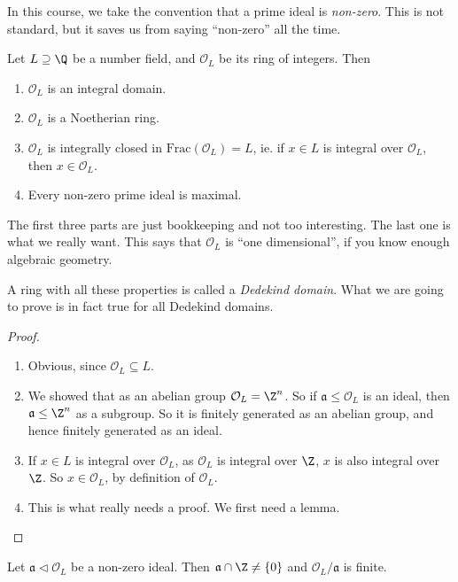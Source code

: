 \documentclass[a4paper]{article}
\begin{document}
In this course, we take the convention that a prime ideal is \emph{non-zero}. This is not standard, but it saves us from saying ``non-zero'' all the time.

\begin{prop}
  Let $L \supseteq \Q$ be a number field, and $\mathcal{O}_L$ be its ring of integers. Then
  \begin{enumerate}
    \item $\mathcal{O}_L$ is an integral domain.
    \item $\mathcal{O}_L$ is a Noetherian ring.
    \item $\mathcal{O}_L$ is integrally closed in $\mathrm{Frac}(\mathcal{O}_L) = L$, ie. if $x \in L$ is integral over $\mathcal{O}_L$, then $x \in \mathcal{O}_L$.
    \item Every non-zero prime ideal is maximal.
  \end{enumerate}
\end{prop}
The first three parts are just bookkeeping and not too interesting. The last one is what we really want. This says that $\mathcal{O}_L$ is ``one dimensional'', if you know enough algebraic geometry.

A ring with all these properties is called a \emph{Dedekind domain}. What we are going to prove is in fact true for all Dedekind domains.

\begin{proof}\leavevmode
  \begin{enumerate}
    \item Obvious, since $\mathcal{O}_L \subseteq L$.
    \item We showed that as an abelian group $\mathcal{O}_L = \Z^n$. So if $\mathfrak{a} \leq \mathcal{O}_L$ is an ideal, then $\mathfrak{a} \leq \Z^n$ as a subgroup. So it is finitely generated as an abelian group, and hence finitely generated as an ideal.
    \item If $x \in L$ is integral over $\mathcal{O}_L$, as $\mathcal{O}_L$ is integral over $\Z$, $x$ is also integral over $\Z$. So $x \in \mathcal{O}_L$, by definition of $\mathcal{O}_L$.
    \item This is what really needs a proof. We first need a lemma.
  \end{enumerate}
\end{proof}

\begin{lemma}
  Let $\mathfrak{a}\lhd \mathcal{O}_L$ be a non-zero ideal. Then $\mathfrak{a} \cap \Z \not= \{0\}$ and $\mathcal{O}_L/\mathfrak{a}$ is finite.
\end{lemma}
\end{document}
